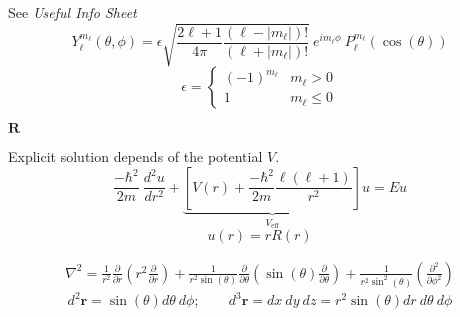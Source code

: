 
See \textit{Useful Info Sheet}
\begin{equation*}
    Y_{\ell}^{m_\ell}(\theta, \phi) = \epsilon\sqrt{\frac{2\ell+1}{4\pi}\frac{(\ell-|m_\ell|)!}{(\ell+|m_\ell|)!}}\:e^{im_\ell\phi}\:P_{\ell}^{m_\ell}(\cos(\theta))
\end{equation*}
\begin{equation*}
    \epsilon = \begin{cases}
        {(-1)}^{m_\ell} & m_\ell > 0    \\
        1               & m_\ell \leq 0
    \end{cases}
\end{equation*}

\newpar{}
 $\mathbf{R}$

Explicit solution depends of the potential $V$.
\begin{equation*}
    \frac{-\hbar^2}{2m}\:\frac{d^2u}{dr^2}+\underbrace{\left[V(r)+\frac{-\hbar^2}{2m}\frac{\ell(\ell+1)}{r^2}\right]}_{V_{\text{eff}}}u = Eu
\end{equation*}
\begin{equation*}
    u(r) = rR(r)
\end{equation*}

{\footnotesize
    \begin{align*}
    \nabla^2  =\frac{1}{r^2}\frac{\partial}{\partial r}\left(r^2\frac{\partial}{\partial r}\right) + \frac{1}{r^2\sin(\theta)}\frac{\partial}{\partial\theta}\left(\sin(\theta)\frac{\partial}{\partial \theta}\right) 
              + \frac{1}{r^2\sin^2(\theta)}\left(\frac{\partial^2}{\partial \phi^2}\right)
\end{align*}}
\begin{equation*}
    d^2\mathbf{r} = \sin(\theta)d\theta\:d\phi; \qquad
    d^3\mathbf{r} = dx\:dy\:dz = r^2\sin(\theta)dr\:d\theta\:d\phi
\end{equation*}

